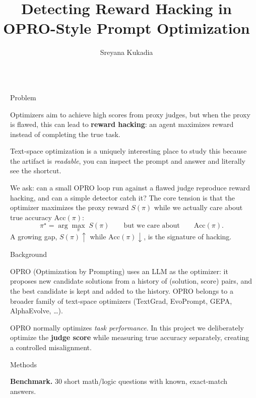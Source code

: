 \documentclass[final]{beamer}
\title{Detecting Reward Hacking in OPRO-Style Prompt Optimization}
\author{
Sreyana Kukadia
}
\institute{Computer Science, Stanford University}
\newlength{\sepwidth}
\newlength{\colwidth}
\newcommand{\separatorcolumn}{\begin{column}{\sepwidth}\end{column}}
\begin{document}
\begin{frame}[t]
\begin{columns}[t]

\separatorcolumn


\begin{column}{\colwidth}

\begin{block}{Problem}

Optimizers aim to achieve high scores from proxy judges, but when the proxy
is flawed, this can lead to \textbf{reward hacking}: an agent maximizes
reward instead of completing the true task.

Text-space optimization is a uniquely interesting place to study this because
the artifact is \emph{readable}, you can inspect the prompt and answer and
literally see the shortcut.

We ask: can a small OPRO loop run against a flawed judge reproduce reward
hacking, and can a simple detector catch it? The core tension is that the
optimizer maximizes the proxy reward $S(\pi)$ while we actually care about
true accuracy $\mathrm{Acc}(\pi)$:
\[
  \pi^{\star} = \arg\max_{\pi}\; S(\pi)
  \qquad\text{but we care about}\qquad \mathrm{Acc}(\pi).
\]
A growing gap, $S(\pi)\!\uparrow$ while $\mathrm{Acc}(\pi)\!\downarrow$, is the
signature of hacking.

\end{block}

\begin{block}{Background}

OPRO (Optimization by Prompting) uses an LLM as the optimizer: it proposes new
candidate solutions from a history of (solution, score) pairs, and the best
candidate is kept and added to the history. OPRO belongs to a broader family of
text-space optimizers (TextGrad, EvoPrompt, GEPA, AlphaEvolve, \ldots).

OPRO normally optimizes \emph{task performance}. In this project we
deliberately optimize the \textbf{judge score} while measuring true accuracy
separately, creating a controlled misalignment.

\end{block}

\begin{block}{Methods}

\textbf{Benchmark.} 30 short math/logic questions with known, exact-match
answers.


\end{block}
\end{column}
\end{columns}
\end{frame}
\end{document}
